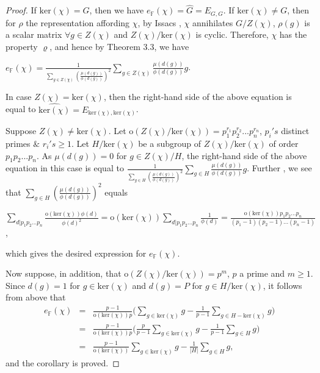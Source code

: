 \documentclass[12pt, reqno]{amsart}
\numberwithin{equation}{section}
\theoremstyle{definition}
\theoremstyle{remark}
\theoremstyle{plain}
\begin{document}
\begin{proof}
If $\text{ker}(\chi)=G$, then we have $e_{\mathbb{F}}(\chi)=\widehat{G}=E_{G,G}$. If $\text{ker}(\chi)\neq G$, then for $\rho$ the representation affording $\chi$, by Issacs \cite{Isaacs}, $\chi$ annihilates $G/Z(\chi)$, $\rho(g)$ is a scalar matrix $\forall g\in Z(\chi)$ and $Z(\chi)/\text{ker}(\chi)$ is cyclic. Therefore, $\chi$ has the property $\varrho$, and hence by Theorem 3.3, we have
\begin{center}
$e_{\mathbb{F}}(\chi)= \frac{1}{\sum_{g\in Z(\chi)}(\frac{\mu(d(g))}{\phi(d(g))})^{2}}\sum_{g\in Z(\chi)}\frac{\mu(d(g))}{\phi(d(g))}g$.  
\end{center}\smallskip

In case $Z(\chi)=\text{ker}(\chi)$, then the right-hand side of the above equation is equal to $\widehat{\text{ker}(\chi)}=E_{\text{ker}(\chi),\text{ker}(\chi)}$.\smallskip

Suppose $Z(\chi)\neq \text{ker}(\chi)$. Let $\text{o}(Z(\chi)/\text{ker}(\chi))=p^{r_1}_1p^{r_2}_2...p^{r_n}_n$, $p_i's$ distinct primes $\&$ $ r_i's\geq 1$. Let $H/\text{ker}(\chi)$ be a subgroup of $Z(\chi)/\text{ker}(\chi)$ of order $p_1p_2...p_n$. As $\mu(d(g))=0$ for $g\in Z(\chi)/H$, the right-hand side of the above equation in this case is equal to $\frac{1}{\sum_{g\in H}(\frac{\mu(d(g))}{\phi(d(g))})^{2}}\sum_{g\in H}\frac{\mu(d(g))}{\phi(d(g))}g$. Further , we see that $\sum_{g\in H}(\frac{\mu(d(g))}{\phi(d(g))})^{2}$ equals
\begin{center}
 $\sum_{d|p_1p_2...p_n}\frac{\text{o}(\text{ker}(\chi))\phi(d)}{\phi(d)^2}=\text{o}(\text{ker}(\chi))\sum_{d|p_1p_2...p_n}\frac{1}{\phi(d)}=\frac{\text{o}(\text{ker}(\chi))p_1p_2...p_n}{(p_1-1)(p_2-1)...(p_n-1)}$, 
\end{center}
which gives the desired expression for $e_{\mathbb{F}}(\chi)$.\smallskip

Now suppose, in addition, that $\text{o}(Z(\chi)/\text{ker}(\chi))=p^m$, $p$ a prime and $m\geq 1$. Since $d(g)=1$ for $g\in \text{ker}(\chi)$ and $d(g)=P$ for $g\in H/\text{ker}(\chi)$, it follows from above that
\begin{eqnarray}\nonumber
  e_{\mathbb{F}}(\chi) &=& \frac{p-1}{\text{o}(\text{ker}(\chi))p}\bigg(\sum_{g\in \text{ker}(\chi)}g-\frac{1}{p-1}\sum_{g\in H-\text{ker}(\chi)}g\bigg) \\\nonumber
   &=& \frac{p-1}{\text{o}(\text{ker}(\chi))p}\bigg(\frac{p}{p-1}\sum_{g\in \text{ker}(\chi)}g-\frac{1}{p-1}\sum_{g\in H}g\bigg) \\\nonumber
   &=& \frac{p-1}{\text{o}(\text{ker}(\chi))}\sum_{g\in \text{ker}(\chi)}g-\frac{1}{|H|}\sum_{g\in H}g\nonumber,
\end{eqnarray}
and the corollary is proved.
\end{proof}
\end{document}
